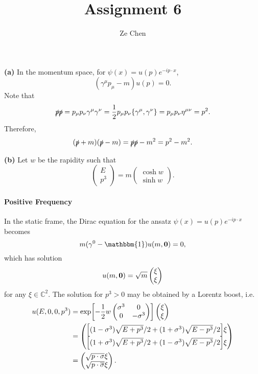 \documentclass{article}
\title{Assignment 6}
\author{Ze Chen}
\makeatletter
\newcommand*{\shifttext}[1]{%
  \settowidth{\@tempdima}{#1}%
  \hspace{-\@tempdima}#1%
}
\newcommand{\plabel}[1]{%
\shifttext{\textbf{#1}\quad}%
}
\makeatother
\begin{document}
\maketitle

% 
% 

\plabel{(a)}%
In the momentum space, for $\psi(x) = u(p) e^{-ip\cdot x}$,
\[ (\gamma^\mu p_\mu - m)u(p) = 0. \]
Note that
\[ \slashed{p}\slashed{p} = p_\mu p_\nu \gamma^\mu \gamma^\nu = \frac{1}{2} p_\mu p_\nu \qty{\gamma^\mu,\gamma^\nu} = p_\mu p_\nu\eta^{\mu\nu} = p^2. \]
Therefore,
\[ (\slashed{p} + m)(\slashed{p}-m) = \slashed{p}\slashed{p} - m^2 = p^2 - m^2. \]

\plabel{(b)}%
Let $w$ be the rapidity such that
\[ \begin{pmatrix}
    E \\ p^3
\end{pmatrix} = m \begin{pmatrix}
    \cosh w \\ \sinh w
\end{pmatrix}. \]
\paragraph*{Positive Frequency}
In the static frame, the Dirac equation for the ansatz $\psi(x) = u(p) e^{-ip\cdot x}$ becomes
\[ m(\gamma^0 - \mathbbm{1}) u(m,\vb{0}) = 0, \]
which has solution 
\[ u(m,\vb{0}) = \sqrt{m}\begin{pmatrix}
    \xi \\ \xi
\end{pmatrix}  \]
for any $\xi \in \mathbb{C}^2$.
The solution for $p^3>0$ may be obtained by a Lorentz boost, i.e.
\begin{align*}
    u(E,0,0,p^3) &= \exp[-\frac{1}{2}w\begin{pmatrix}
        \sigma^3 & 0 \\
        0 & -\sigma^3
    \end{pmatrix}] \begin{pmatrix}
        \xi \\ \xi
    \end{pmatrix} \\
    &= \begin{pmatrix}
        \qty[(1-\sigma^3)\sqrt{E+p^3}/2+(1+\sigma^3)\sqrt{E-p^3}/2] \xi \\
        \qty[(1+\sigma^3)\sqrt{E+p^3}/2+(1-\sigma^3)\sqrt{E-p^3}/2] \xi
    \end{pmatrix} \\
    &= \begin{pmatrix}
        \sqrt{p\cdot \sigma} \xi \\
        \sqrt{p\cdot \overline{\sigma}} \xi
    \end{pmatrix}.
\end{align*}
\end{document}
